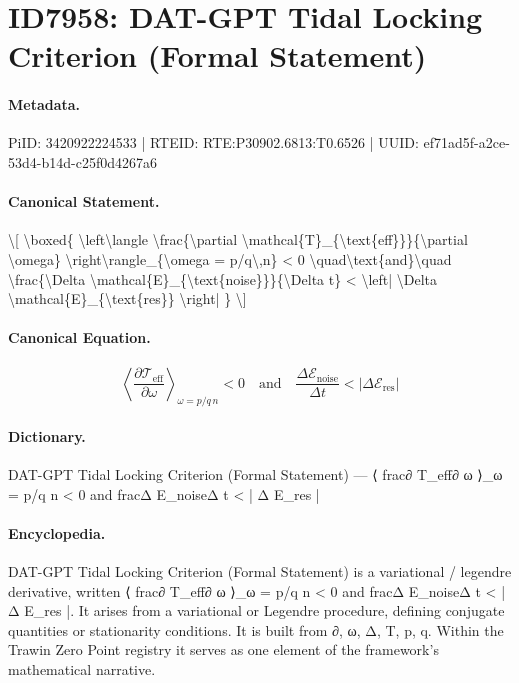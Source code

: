 \section*{ID7958: DAT-GPT Tidal Locking Criterion (Formal Statement)}
\paragraph{Metadata.}
PiID: 3420922224533 | RTEID: RTE:P30902.6813:T0.6526 | UUID: ef71ad5f-a2ce-53d4-b14d-c25f0d4267a6

\paragraph{Canonical Statement.}
\textbackslash{}[ \textbackslash{}boxed\{ \textbackslash{}left\textbackslash{}langle \textbackslash{}frac\{\textbackslash{}partial \textbackslash{}mathcal\{T\}\_\{\textbackslash{}text\{eff\}\}\}\{\textbackslash{}partial \textbackslash{}omega\} \textbackslash{}right\textbackslash{}rangle\_\{\textbackslash{}omega = p/q\textbackslash{},n\} < 0 \textbackslash{}quad\textbackslash{}text\{and\}\textbackslash{}quad \textbackslash{}frac\{\textbackslash{}Delta \textbackslash{}mathcal\{E\}\_\{\textbackslash{}text\{noise\}\}\}\{\textbackslash{}Delta t\} < \textbackslash{}left| \textbackslash{}Delta \textbackslash{}mathcal\{E\}\_\{\textbackslash{}text\{res\}\} \textbackslash{}right| \} \textbackslash{}]

\paragraph{Canonical Equation.}
\[
\boxed{ \left\langle \frac{\partial \mathcal{T}_{\text{eff}}}{\partial \omega} \right\rangle_{\omega = p/q\,n} < 0 \quad\text{and}\quad \frac{\Delta \mathcal{E}_{\text{noise}}}{\Delta t} < \left| \Delta \mathcal{E}_{\text{res}} \right| }
\]

\paragraph{Dictionary.}
DAT-GPT Tidal Locking Criterion (Formal Statement) — ⟨ frac∂ T\_eff∂ ω ⟩\_ω = p/q n < 0 and fracΔ E\_noiseΔ t < | Δ E\_res |

\paragraph{Encyclopedia.}
DAT-GPT Tidal Locking Criterion (Formal Statement) is a variational / legendre derivative, written ⟨ frac∂ T\_eff∂ ω ⟩\_ω = p/q n < 0 and fracΔ E\_noiseΔ t < | Δ E\_res |. It arises from a variational or Legendre procedure, defining conjugate quantities or stationarity conditions. It is built from ∂, ω, Δ, T, p, q. Within the Trawin Zero Point registry it serves as one element of the framework's mathematical narrative.

